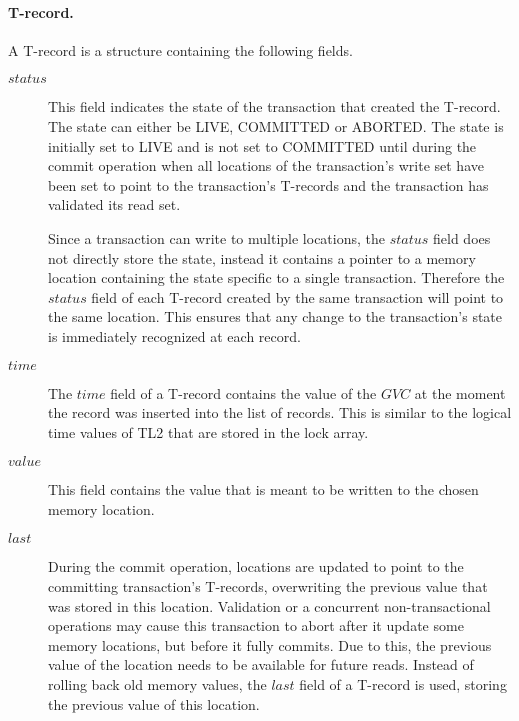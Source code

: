 \documentclass[runningheads,a4paper]{llncs}
\begin{document}
\paragraph{T-record.}
A T-record is a structure containing the following fields.
\begin{description}
\item[$\mathit{status}$]
This  field  indicates  the  state  of the  transaction  that  created  the
T-record. The  
state can either be LIVE, COMMITTED or ABORTED.
The state is initially set to LIVE and is not set to COMMITTED until during the commit operation when 
all locations of the transaction's write set have been set to point to the transaction's T-records
and the transaction has validated its read set.

Since a transaction can write to multiple locations, the $\mathit{status}$ field
does not directly store the state, instead it contains a
pointer to a memory location containing the state specific to a single transaction.
Therefore the $\mathit{status}$ field of each T-record created by the same transaction will point to the same location.
This ensures that any change to the transaction's state is immediately recognized at each record.
\item[$\mathit{time}$]
The  $\mathit{time}$  field of  a T-record  contains the  
value of  the $\mathit{GVC}$  at  the  moment the  record  was 
inserted  into the  list of   records.
This is similar to the logical time values of TL2 that are stored in the lock array.
\item[$\mathit{value}$]
This field contains the value that is meant to be written to the chosen 
memory location.
\item[$\mathit{last}$]
During the commit operation, locations are updated to point
to the committing transaction's T-records, overwriting the previous value
that was stored in this location.
Validation or a concurrent non-transactional operations may cause this transaction to abort 
after it update some memory locations, but before
it fully commits.
Due to this, the previous value of the location needs to be available for future reads.
Instead of rolling back old memory values, the $\mathit{last}$ field of a T-record is used,
storing the previous value of this location.

\end{description}
\end{document}
